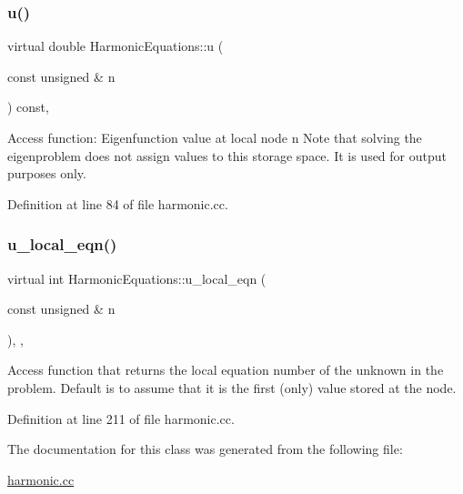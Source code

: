 \subsubsection{\texorpdfstring{u()}{u()}}
{\footnotesize\ttfamily virtual double Harmonic\+Equations\+::u (\begin{DoxyParamCaption}\item[{const unsigned \&}]{n }\end{DoxyParamCaption}) const\hspace{0.3cm}{\ttfamily [inline]}, {\ttfamily [virtual]}}



Access function\+: Eigenfunction value at local node n Note that solving the eigenproblem does not assign values to this storage space. It is used for output purposes only. 



Definition at line 84 of file harmonic.\+cc.

\mbox{\label{classHarmonicEquations_a89ff4c11fade61386745931722a75e1d}} 
\subsubsection{\texorpdfstring{u\+\_\+local\+\_\+eqn()}{u\_local\_eqn()}}
{\footnotesize\ttfamily virtual int Harmonic\+Equations\+::u\+\_\+local\+\_\+eqn (\begin{DoxyParamCaption}\item[{const unsigned \&}]{n }\end{DoxyParamCaption})\hspace{0.3cm}{\ttfamily [inline]}, {\ttfamily [protected]}, {\ttfamily [virtual]}}



Access function that returns the local equation number of the unknown in the problem. Default is to assume that it is the first (only) value stored at the node. 



Definition at line 211 of file harmonic.\+cc.



The documentation for this class was generated from the following file\+:\begin{DoxyCompactItemize}
\item 
\hyperlink{harmonic_8cc}{harmonic.\+cc}\end{DoxyCompactItemize}
